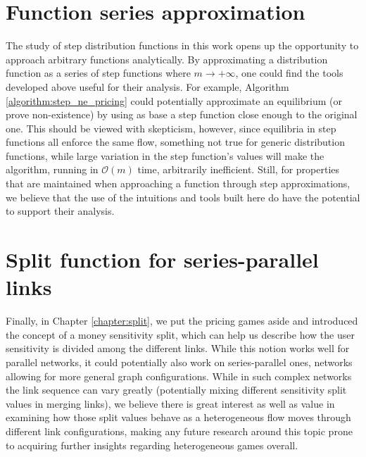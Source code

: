 \documentclass[10pt,a4paper]{book}
\theoremstyle{definition}
\theoremstyle{comment}
\begin{document}
\section*{Function series approximation}

The study of step distribution functions in this work opens up the opportunity to approach arbitrary functions analytically.
By approximating a distribution function as a series of step functions where $m \rightarrow +\infty$, one could find the tools developed above useful for their analysis.
For example, Algorithm \ref{algorithm:step_ne_pricing} could potentially approximate an equilibrium (or prove non-existence) by using as base a step function close enough to the original one.
This should be viewed with skepticism, however, since equilibria in step functions all enforce the same flow, something not true for generic distribution functions, while large variation in the step function's values will make the algorithm, running in $\mathcal{O}(m)$ time, arbitrarily inefficient.
Still, for properties that are maintained when approaching a function through step approximations, we believe that the use of the intuitions and tools built here do have the potential to support their analysis.

\section*{Split function for series-parallel links}

Finally, in Chapter \ref{chapter:split}, we put the pricing games aside and introduced the concept of a money sensitivity split, which can help us describe how the user sensitivity is divided among the different links.
While this notion works well for parallel networks, it could potentially also work on series-parallel ones, networks allowing for more general graph configurations.
While in such complex networks the link sequence can vary greatly (potentially mixing different sensitivity split values in merging links), we believe there is great interest as well as value in examining how those split values behave as a heterogeneous flow moves through different link configurations, making any future research around this topic prone to acquiring further insights regarding heterogeneous games overall.

\cleardoublepage

{}


\cleardoublepage
\end{document}
